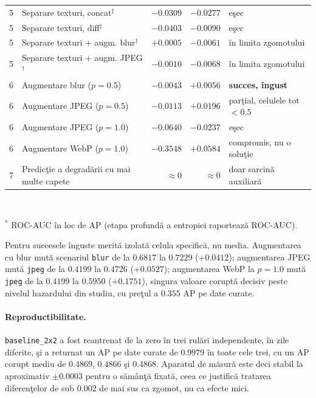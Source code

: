 \begin{table}[t]
\begin{tabular}{llrrl}
    \midrule
    5 & Separare texturi, concat$^\ddagger$      & $-0.0309$ & $-0.0277$ & eşec \\
    5 & Separare texturi, diff$^\ddagger$        & $-0.0403$ & $-0.0090$ & eşec \\
    5 & Separare texturi + augm. blur$^\dagger$  & $+0.0005$ & $-0.0061$ & în limita zgomotului \\
    5 & Separare texturi + augm. JPEG$^\dagger$  & $-0.0010$ & $-0.0068$ & în limita zgomotului \\
    \midrule
    6 & Augmentare blur ($p=0.5$)                & $-0.0043$ & $\mathbf{+0.0056}$ & \textbf{succes, îngust} \\
    6 & Augmentare JPEG ($p=0.5$)                & $-0.0113$ & $+0.0196$ & parţial, celulele tot $<0.5$ \\
    6 & Augmentare JPEG ($p=1.0$)                & $-0.0640$ & $-0.0237$ & eşec \\
    6 & Augmentare WebP ($p=1.0$)                & $-0.3548$ & $\mathbf{+0.0584}$ & compromis, nu o soluţie \\
    \midrule
    7 & Predicţie a degradării cu mai multe capete & $\approx 0$ & $\approx 0$ & doar sarcină auxiliară \\
    \bottomrule
  \end{tabular}
  \\[2pt]
  \raggedright\footnotesize
  $^{*}$ ROC-AUC în loc de AP (etapa profundă a entropiei raportează ROC-AUC).
\end{table}

Pentru succesele înguste merită izolată celula specifică, nu media. Augmentarea
cu blur mută scenariul \texttt{blur} de la $0.6817$ la $0.7229$ ($+0.0412$);
augmentarea JPEG mută \texttt{jpeg} de la $0.4199$ la $0.4726$ ($+0.0527$);
augmentarea WebP la $p=1.0$ mută \texttt{jpeg} de la $0.4199$ la $0.5950$
($+0.1751$), singura valoare coruptă decisiv peste nivelul hazardului din studiu,
cu preţul a $0.355$ AP pe date curate.

\paragraph{Reproductibilitate.} \texttt{baseline\_2x2} a fost reantrenat de la
zero în trei rulări independente, în zile diferite, şi a returnat un AP pe date
curate de $0.9979$ în toate cele trei, cu un AP corupt mediu de $0.4869$,
$0.4866$ şi $0.4868$. Aparatul de măsură este deci stabil la aproximativ
$\pm0.0003$ pentru o sămânţă fixată, ceea ce justifică tratarea diferenţelor de
sub $0.002$ de mai sus ca zgomot, nu ca efecte mici.

